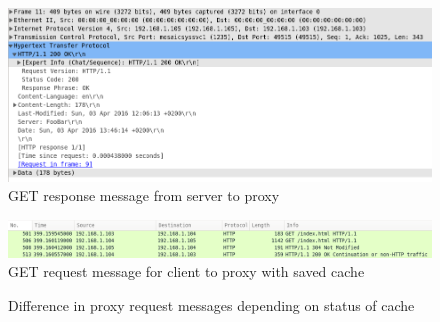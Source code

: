 \documentclass[10pt,twocolumn]{witseiepaper}
\begin{document}
		\begin{figure}[h!]
			\centering
			\includegraphics[width=\columnwidth]{resources/proxy_server}
			\caption{GET response message from server to proxy}
			\label{fig:proxy_server}
		\end{figure}
		
		\begin{figure}[h!]
			\centering
			\includegraphics[width=\columnwidth]{resources/proxy_cache}
			\caption{GET request message for client to proxy with saved cache}
			\label{fig:proxy_cache}
		\end{figure}
		
		\begin{figure}[h!]
			\centering
			 \hspace{1cm}
			\caption{Difference in proxy request messages depending on status of cache}
			\label{fig:proxy_comparrison}
		\end{figure}
		
\end{document}
